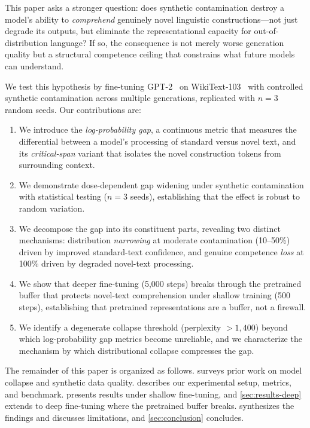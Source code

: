 \documentclass{article}
\begin{document}
This paper asks a stronger question: does synthetic contamination destroy a model's ability to \emph{comprehend} genuinely novel linguistic constructions---not just degrade its outputs, but eliminate the representational capacity for out-of-distribution language?
If so, the consequence is not merely worse generation quality but a structural competence ceiling that constrains what future models can understand.

We test this hypothesis by fine-tuning GPT-2~\citep{radford2019language} on WikiText-103~\citep{merity2017pointer} with controlled synthetic contamination across multiple generations, replicated with $n{=}3$ random seeds.
Our contributions are:

\begin{enumerate}[leftmargin=*]
  \item We introduce the \emph{log-probability gap}, a continuous metric that measures the differential between a model's processing of standard versus novel text, and its \emph{critical-span} variant that isolates the novel construction tokens from surrounding context.
  \item We demonstrate dose-dependent gap widening under synthetic contamination with statistical testing ($n{=}3$ seeds), establishing that the effect is robust to random variation.
  \item We decompose the gap into its constituent parts, revealing two distinct mechanisms: distribution \emph{narrowing} at moderate contamination (10--50\%) driven by improved standard-text confidence, and genuine competence \emph{loss} at 100\% driven by degraded novel-text processing.
  \item We show that deeper fine-tuning (5{,}000 steps) breaks through the pretrained buffer that protects novel-text comprehension under shallow training (500 steps), establishing that pretrained representations are a buffer, not a firewall.
  \item We identify a degenerate collapse threshold (perplexity $> 1{,}400$) beyond which log-probability gap metrics become unreliable, and we characterize the mechanism by which distributional collapse compresses the gap.
\end{enumerate}

The remainder of this paper is organized as follows.
 surveys prior work on model collapse and synthetic data quality.
 describes our experimental setup, metrics, and benchmark.
 presents results under shallow fine-tuning, and \cref{sec:results-deep} extends to deep fine-tuning where the pretrained buffer breaks.
 synthesizes the findings and discusses limitations, and \cref{sec:conclusion} concludes.
\end{document}
